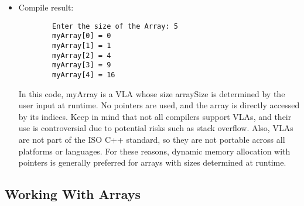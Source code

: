 \begin{itemize}
      Example of declare an array with out useing pointers and still set its length at runtime(Using  Variable Length Arrays (VLA)):
      \begin{lstlisting}
        #include <stdio.h>

        int main(){
                int arraySize;
        
                //Ask the user for the array size:
                printf("Enter the size of the array: ");
                scanf("%d", &arraySize);
        
                //declare VLA based on the user input:
                int myArray[arraySize];
        
                //Intitialize array with values
                for (int i = 0; i < arraySize; i++){
                        myArray[i] = i * i;
                }
        
                //Print array values:
                for (int i = 0; i < arraySize; i++){
                        printf("myArray[%d] = %d\n", i, myArray[i]);
                }
        
                return 0;
        }
      \end{lstlisting}
      \item Compile result:
      \begin{lstlisting}
        Enter the size of the Array: 5
        myArray[0] = 0
        myArray[1] = 1
        myArray[2] = 4
        myArray[3] = 9
        myArray[4] = 16
      \end{lstlisting}
      In this code, myArray is a VLA whose size arraySize is determined by the user input at runtime. No pointers are used, and the array is directly accessed by its indices.
      Keep in mind that not all compilers support VLAs, and their use is controversial due to potential risks such as stack overflow. Also, VLAs are not part of the ISO C++ standard, so they are not portable across all platforms or languages. For these reasons, dynamic memory allocation with pointers is generally preferred for arrays with sizes determined at runtime.
    \end{itemize} 

\subsection{Working With Arrays}
